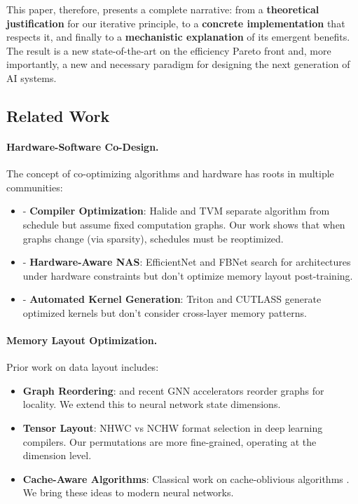 \documentclass{article}
\begin{document}
This paper, therefore, presents a complete narrative: from a \textbf{theoretical justification} for our iterative principle, to a \textbf{concrete implementation} that respects it, and finally to a \textbf{mechanistic explanation} of its emergent benefits. The result is a new state-of-the-art on the efficiency Pareto front and, more importantly, a new and necessary paradigm for designing the next generation of AI systems.

\subsection{Related Work}

\paragraph{Hardware-Software Co-Design.}
The concept of co-optimizing algorithms and hardware has roots in multiple communities:
\begin{itemize}
    \item - \textbf{Compiler Optimization}: Halide \cite{ragan2013halide} and TVM \cite{chen2018tvm} separate algorithm from schedule but assume fixed computation graphs. Our work shows that when graphs change (via sparsity), schedules must be reoptimized.
    \item - \textbf{Hardware-Aware NAS}: EfficientNet \cite{tan2019efficientnetrm} and FBNet \cite{Wu2018FBNetHE} search for architectures under hardware constraints but don't optimize memory layout post-training.
    \item - \textbf{Automated Kernel Generation}: Triton \cite{Tillet2019TritonAI} and CUTLASS generate optimized kernels but don't consider cross-layer memory patterns.
\end{itemize}

\paragraph{Memory Layout Optimization.}
Prior work on data layout includes:
\begin{itemize}
    \item \textbf{Graph Reordering}: \cite{karypis1997metis} and recent GNN accelerators \cite{Zhang2021UnderstandingGC} reorder graphs for locality. We extend this to neural network state dimensions.
    \item \textbf{Tensor Layout}: NHWC vs NCHW format selection in deep learning compilers. Our permutations are more fine-grained, operating at the dimension level.
    \item \textbf{Cache-Aware Algorithms}: Classical work on cache-oblivious algorithms \cite{frigo1999cacheobliviousalgorithms}. We bring these ideas to modern neural networks.
\end{itemize}
\end{document}
